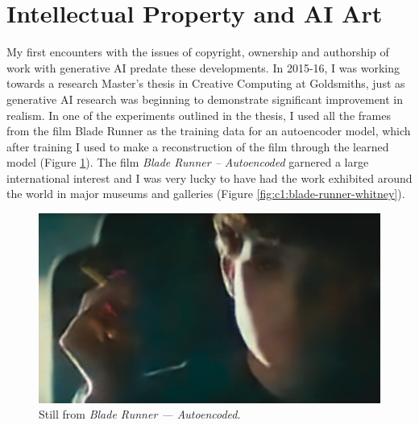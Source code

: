 \section{Intellectual Property and AI Art}

My first encounters with the issues of copyright, ownership and authorship of work with generative AI predate these developments. 
In 2015-16, I was working towards a research Master's thesis in Creative Computing at Goldsmiths, just as generative AI research was beginning to demonstrate significant improvement in realism. 
In one of the experiments outlined in the thesis, I used all the frames from the film Blade Runner as the training data for an autoencoder model, which after training I used to make a reconstruction of the film through the learned model \citep{broad2016autoencoding} (Figure \ref{fig:c1:blade-runner}).
The film \textit{Blade Runner -- Autoencoded} garnered a large international interest and I was very lucky to have had the work exhibited around the world in major museums and galleries \citep{broad2017autoencoding} (Figure \ref{fig:c1:blade-runner-whitney}).

\begin{figure}[!htb]
    \centering
    \captionsetup{justification=centering}
    \includegraphics[width=1\textwidth]{figures/c1_intro/blade_runner_still.png}
    \caption{Still from \textit{Blade Runner --- Autoencoded}.}
    \label{fig:c1:blade-runner}
\end{figure}

